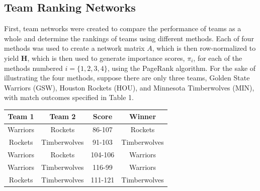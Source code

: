 \documentclass[12pt]{article}%
\begin{document}
\subsection{Team Ranking Networks}
\label{sec:2.2}
\null\quad\quad First, team networks were created to compare the performance of teams as a whole and determine the rankings of teams using different methods. Each of four methods was used to create a network matrix $A$, which is then row-normalized to yield \textbf{H}, which is then used to generate importance scores, $\pi_i$, for each of the methods numbered $i=\{1,2,3,4\}$, using the PageRank algorithm. For the sake of illustrating the four methods, suppose there are only three teams, Golden State Warriors (GSW), Houston Rockets (HOU), and Minnesota Timberwolves (MIN), with match outcomes specified in Table 1.
\begin{center}
\begin{tabular}{|c|c|c|c|}
\hline
\textbf{Team 1} & \textbf{Team 2} & \textbf{Score} & \textbf{Winner}\\
\hline
Warriors & Rockets & 86-107 & Rockets\\
Rockets & Timberwolves & 91-103 & Timberwolves\\
Warriors & Rockets & 104-106 & Warriors\\
Warriors & Timberwolves & 116-99 & Warriors\\
Rockets & Timberwolves & 111-121 & Timberwolves\\
\hline
\end{tabular}
\end{center}
\end{document}
